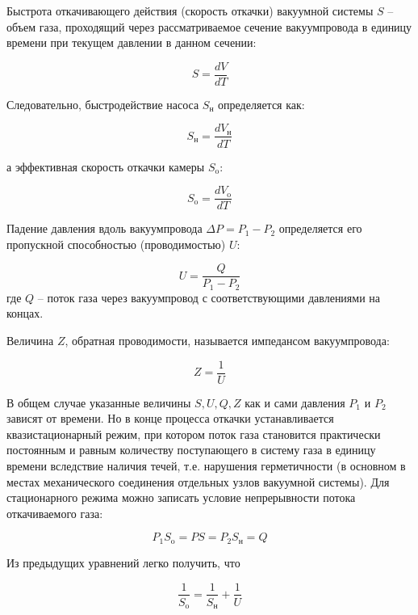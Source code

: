 \documentclass[12pt,a4paper]{article}
\begin{document}
Быстрота откачивающего действия (скорость откачки) вакуумной системы $S$ -- объем газа, проходящий через рассматриваемое сечение вакуумпровода в единицу времени при текущем давлении
в данном сечении:

\begin{equation}
	S = \frac{dV}{dT}
\end{equation}

Следовательно, быстродействие насоса $S_{\text{н}}$ определяется как:

\begin{equation}
	S_{\text{н}} = \frac{dV_{\text{н}}}{dT}
\end{equation}

а эффективная скорость откачки камеры $S_{\text{o}}$:

\begin{equation}
	S_{\text{o}} = \frac{dV_{\text{o}}}{dT}
\end{equation}

Падение давления вдоль вакуумпровода $\Delta P = P_1 - P_2$ определяется его пропускной способностью (проводимостью) $U$:

\begin{equation}
	U = \frac{Q}{P_1 - P_2}
\end{equation}
где $Q$ -- поток газа через вакуумпровод с соответствующими
давлениями на концах.

Величина $Z$, обратная проводимости, называется импедансом вакуумпровода:

\begin{equation}
	Z = \frac{1}{U}
\end{equation}

В общем случае указанные величины $S, U, Q, Z$ как и сами давления $P_1$ и $P_2$ зависят от времени. Но в конце процесса откачки устанавливается квазистационарный режим, при котором поток газа становится практически постоянным и равным количеству поступающего в систему газа
в единицу времени вследствие наличия течей, т.е. нарушения герметичности (в основном в местах механического соединения отдельных узлов
вакуумной системы). Для стационарного режима можно записать условие
непрерывности потока откачиваемого газа:

\begin{equation}
	P_1S_{\text{o}} = PS = P_2S_{\text{н}} = Q
\end{equation}

Из предыдущих уравнений легко получить, что

\begin{equation}
	\frac{1}{S_{\text{o}}} = \frac{1}{S_{\text{н}}} + \frac{1}{U}
\end{equation}
\end{document}
